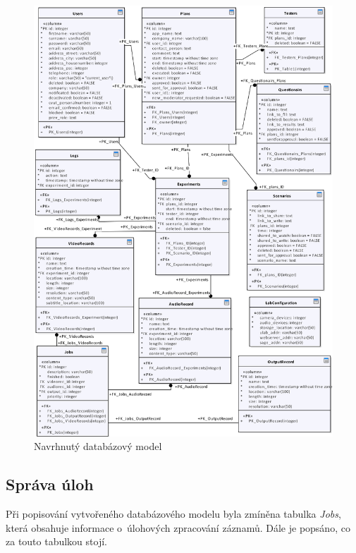 \documentclass[thesis=M,czech]{FITthesis}[2012/06/26]
\begin{document}
\begin{figure}[h]\centering
	\includegraphics[width=1\textwidth]{images/db.eps}
	\caption{Navrhnutý databázový model}\label{img:navrh_backend_db}
\end{figure}

\subsection{Správa úloh} \label{subsec:navrh_backend_ulohy}
Při popisování vytvořeného databázového modelu byla zmíněna tabulka \textit{Jobs}, která obsahuje informace o~úlohových zpracování záznamů. Dále je popsáno, co za touto tabulkou stojí.
\end{document}
